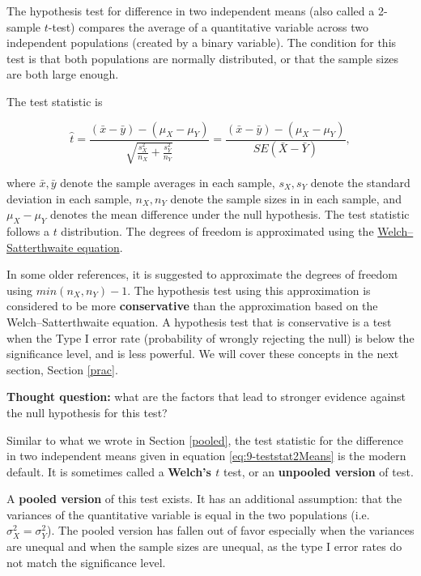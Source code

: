 \documentclass[
]{book}
\theoremstyle{definition}
\theoremstyle{definition}
\theoremstyle{definition}
\theoremstyle{definition}
\theoremstyle{remark}
\begin{document}
The hypothesis test for difference in two independent means (also called a 2-sample \(t\)-test) compares the average of a quantitative variable across two independent populations (created by a binary variable). The condition for this test is that both populations are normally distributed, or that the sample sizes are both large enough.

The test statistic is

\begin{equation} 
\hat{t} =  \frac{(\bar{x} - \bar{y}) - (\mu_X - \mu_Y)}{\sqrt{\frac{s_X^2}{n_X} + \frac{s_Y^2}{n_Y}}} = \frac{(\bar{x} - \bar{y}) - (\mu_X - \mu_Y)}{SE(\bar{X} - \bar{Y})},
\label{eq:9-teststat2Means}
\end{equation}

where \(\bar{x}, \bar{y}\) denote the sample averages in each sample, \(s_X, s_Y\) denote the standard deviation in each sample, \(n_X, n_Y\) denote the sample sizes in in each sample, and \(\mu_X - \mu_Y\) denotes the mean difference under the null hypothesis. The test statistic follows a \(t\) distribution. The degrees of freedom is approximated using the \href{https://en.wikipedia.org/wiki/Welch\%27s_t-test\#Calculations}{Welch--Satterthwaite equation}.

In some older references, it is suggested to approximate the degrees of freedom using \(min(n_X, n_Y) - 1\). The hypothesis test using this approximation is considered to be more \textbf{conservative} than the approximation based on the Welch--Satterthwaite equation. A hypothesis test that is conservative is a test when the Type I error rate (probability of wrongly rejecting the null) is below the significance level, and is less powerful. We will cover these concepts in the next section, Section \ref{prac}.

\textbf{Thought question:} what are the factors that lead to stronger evidence against the null hypothesis for this test?

Similar to what we wrote in Section \ref{pooled}, the test statistic for the difference in two independent means given in equation \eqref{eq:9-teststat2Means} is the modern default. It is sometimes called a \textbf{Welch's \(t\)} test, or an \textbf{unpooled version} of test.

A \textbf{pooled version} of this test exists. It has an additional assumption: that the variances of the quantitative variable is equal in the two populations (i.e.~\(\sigma_X^2 = \sigma_Y^2\)). The pooled version has fallen out of favor especially when the variances are unequal and when the sample sizes are unequal, as the type I error rates do not match the significance level.
\end{document}
